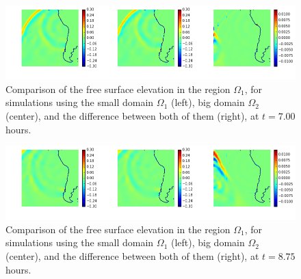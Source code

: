\begin{figure}
	\center
	\includegraphics[width=\textwidth]{figures/GeoclawChile2010_comparison_it28}
	\caption{Comparison of  the free surface elevation in the region $\Omega_1$, for simulations using the small domain $\Omega_1$ (left), big domain $\Omega_2$ (center), and the difference between both of them (right), at $t=7.00$ hours.}
	\label{intro:results_frame28}
\end{figure}

\begin{figure}
	\center
	\includegraphics[width=\textwidth]{figures/GeoclawChile2010_comparison_it35}
	\caption{Comparison of the free surface elevation in the region $\Omega_1$, for simulations using the small domain $\Omega_1$ (left), big domain $\Omega_2$ (center), and the difference between both of them (right), at $t=8.75$ hours.}
	\label{intro:results_frame35}
\end{figure}

